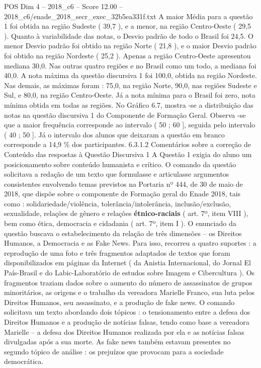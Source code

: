 \begin{textsample}{POS Dim 4 – 2018\_c6 – Score 12.00 – 2018\_c6/enade\_2018\_secr\_exec\_32b5ea331f.txt}
A maior Média para a questão 1 foi obtida na região Sudeste ( 39,7 ), e a menor, na região Centro-Oeste ( 29,5 ).
Quanto à variabilidade das notas, o Desvio padrão de todo o Brasil foi 24,5.
O menor Desvio padrão foi obtido na região Norte ( 21,8 ), e o maior Desvio padrão foi obtido na região Nordeste ( 25,2 ).
Apenas a região Centro-Oeste apresentou mediana 30,0.
Nas outras quatro regiões e no Brasil como um todo, a mediana foi 40,0.
A nota máxima da questão discursiva 1 foi 100,0, obtida na região Nordeste.
Nas demais, as máximas foram : 75,0, na região Norte, 90,0, nas regiões Sudeste e Sul, e 80,0, na região Centro-Oeste.
Já a nota mínima para o Brasil foi zero, nota mínima obtida em todas as regiões.
No Gráfico 6.7, mostra -se a distribuição das notas na questão discursiva 1 do Componente de Formação Geral.
Observa -se que a maior frequência corresponde ao intervalo ( 50 ; 60 ], seguida pelo intervalo ( 40 ; 50 ].
Já o intervalo dos alunos que deixaram a questão em branco corresponde a 14,9 \% dos participantes. 6.3.1.2 Comentários sobre a correção de Conteúdo das respostas à Questão Discursiva 1 A Questão 1 exigia do aluno um posicionamento sobre conteúdo humanista e crítico.
O comando da questão solicitava a redação de um texto que formulasse e articulasse argumentos consistentes envolvendo temas previstos na Portaria nº 444, de 30 de maio de 2018, que dispõe sobre o componente de Formação geral do Enade 2018, tais como : solidariedade/violência, tolerância/intolerância, inclusão/exclusão, sexualidade, relações de gênero e relações \textbf{étnico-raciais} ( art. 7º, item VIII ), bem como ética, democracia e cidadania ( art. 7º, item I ).
O enunciado da questão buscava o estabelecimento da relação de três dimensões – os Direitos Humanos, a Democracia e as Fake News.
Para isso, recorreu a quatro suportes : a reprodução de uma foto e três fragmentos adaptados de textos que foram disponibilizados em páginas da Internet ( da Anistia Internacional, do Jornal El País-Brasil e do Labic-Laboratório de estudos sobre Imagem e Cibercultura ).
Os fragmentos traziam dados sobre o aumento do número de assassinatos de grupos minoritários, as origens e o trabalho da vereadora Marielle Franco, sua luta pelos Direitos Humanos, seu assassinato, e a produção de fake news.
O comando solicitava um texto abordando dois tópicos : o tensionamento entre a defesa dos Direitos Humanos e a produção de notícias falsas, tendo como base a vereadora Marielle – a defesa dos Direitos Humanos realizada por ela e as notícias falsas divulgadas após a sua morte.
As fake news também estavam presentes no segundo tópico de análise : os prejuízos que provocam para a sociedade democrática.

\end{textsample}
